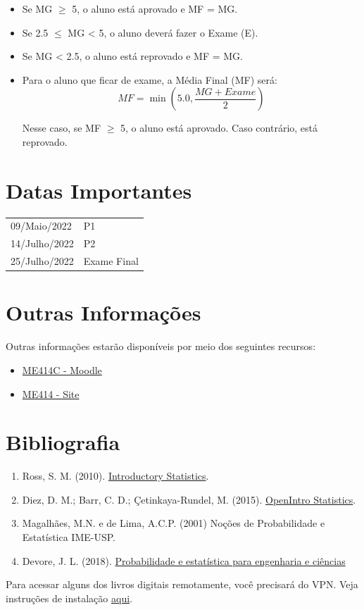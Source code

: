 \documentclass[paper=letter, fontsize=12pt]{scrartcl} %
\begin{document}
\begin{itemize}
\item Se MG $\geq$ 5, o aluno está aprovado e MF = MG.

\item Se 2.5 $\leq$ MG < 5, o aluno deverá fazer o Exame (E).

\item Se MG < 2.5, o aluno está reprovado e MF = MG.

\item Para o aluno que ficar de exame, a Média Final (MF) será:
$$MF = \min\left(5.0, \frac{MG + Exame}{2}\right)$$

Nesse caso, se MF $\geq$ 5, o aluno está aprovado. Caso contrário, está reprovado.


\end{itemize}

\section{Datas Importantes}

\begin{tabular}{ll}
09/Maio/2022  & P1 \\
14/Julho/2022 & P2 \\
25/Julho/2022 & Exame Final
\end{tabular}

\section{Outras Informações}

Outras informações estarão disponíveis por meio dos seguintes recursos:

\begin{itemize}
\item \href{https://moodle.ggte.unicamp.br/course/view.php?id=13073}{{\color{blue} ME414C - Moodle}}
\item \href{https://me414-unicamp.github.io}{{\color{blue} ME414 - Site}}
\end{itemize}

\section{Bibliografia}
\begin{enumerate}
\item Ross, S. M. (2010). \href{http://www.sciencedirect.com/science/book/9780123743886}{Introductory Statistics}.
\item Diez, D. M.; Barr, C. D.; Çetinkaya-Rundel, M. (2015). \href{https://leanpub.com/openintro-statistics}{OpenIntro Statistics}.
\item Magalhães, M.N. e de Lima, A.C.P. (2001) Noções de Probabilidade e Estatística IME-USP.
\item Devore, J. L. (2018). \href{http://acervus.unicamp.br/index.asp?codigo_sophia=1138563}{Probabilidade e estatística para engenharia e ciências}
\end{enumerate}


Para acessar alguns dos livros digitais remotamente, você precisará do VPN. Veja instruções de instalação \href{http://www.ccuec.unicamp.br/ccuec/acesso_remoto_vpn}{{\color{blue} aqui}}.
\end{document}
